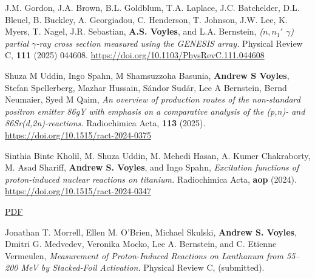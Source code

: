 \begin{bibsection}


\item J.M. Gordon, J.A. Brown, B.L. Goldblum, T.A. Laplace, J.C. Batchelder, D.L. Bleuel, B. Buckley, A. Georgiadou, C. Henderson, T. Johnson, J.W. Lee, K. Myers, T. Nagel, J.R. Sebastian, \textbf{A.S. Voyles}, and L.A. Bernstein, \emph{($n,n_1'$ $\gamma$) partial $\gamma$-ray cross section measured using the GENESIS array.} Physical Review C, \textbf{111} (2025) 044608. \url{https://doi.org/10.1103/PhysRevC.111.044608}


\item Shuza M Uddin, Ingo Spahn, M Shamsuzzoha Basunia, \textbf{Andrew S Voyles}, Stefan Spellerberg, Mazhar Hussain, Sándor Sudár, Lee A Bernstein, Bernd Neumaier, Syed M Qaim, \emph{An overview of production routes of the non-standard positron emitter 86gY with emphasis on a comparative analysis of the (p,n)- and 86Sr(d,2n)-reactions.} Radiochimica Acta, \textbf{113} (2025). \url{https://doi.org/10.1515/ract-2024-0375}




\item Sinthia Binte Kholil, M. Shuza Uddin, M. Mehedi Hasan, A. Kumer Chakraborty, M. Asad Shariff, \textbf{Andrew S. Voyles}, and Ingo Spahn, \emph{Excitation functions of proton-induced nuclear reactions on titanium.} Radiochimica Acta, \textbf{aop} (2024). \url{https://doi.org/10.1515/ract-2024-0347}

\ifshort \vspace{0.1cm} \href{https://avoyles.github.io/papers/Kholil2024_Ti_px.pdf}{\underline{PDF}} \else  \fi



\item Jonathan T. Morrell, Ellen M. O'Brien, Michael Skulski, \textbf{Andrew S. Voyles}, Dmitri G. Medvedev, Veronika Mocko, Lee A. Bernstein, and C. Etienne Vermeulen, \emph{Measurement of Proton-Induced Reactions on Lanthanum from 55--200 MeV by Stacked-Foil Activation.} Physical Review C, (submitted).


\end{bibsection}
